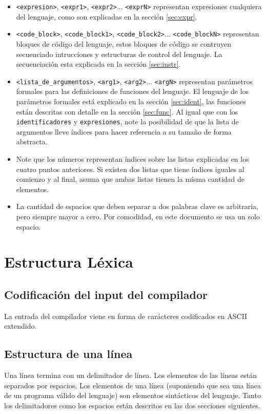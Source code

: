 \documentclass[12pt, spanish]{report}
\begin{document}
\begin{itemize}
\item \texttt{<expresion>}, \texttt{<expr1>}, \texttt{<expr2>}...
  \texttt{<exprN>} representan expresiones cualquiera del lenguaje, como
  son explicadas en la secci\'on \ref{sec:expr}.
       
\item \texttt{<code\_block>}, \texttt{<code\_block1>},
  \texttt{<code\_block2>}...  \texttt{<code\_blockN>} representan
  bloques de c\'odigo del lenguaje, estos bloques de c\'odigo se
  contruyen secuenciado intrucciones y estructuras de control del
  lenguaje. La secuenciaci\'on esta explicada en la secci\'on
  \ref{sec:instr}.
       
\item \texttt{<lista\_de\_argumentos>}, \texttt{<arg1>},
  \texttt{<arg2>}...  \texttt{<argN>} representan par\'ametros formales
  para las definiciones de funciones del lenguaje. El lenguaje de los
  par\'ametros formales est\'a explicado en la secci\'on
  \ref{sec:ident}, las funciones est\'an descritas con detalle en la
  secci\'on \ref{sec:func}. Al igual que con los
  \texttt{identificadores} y \texttt{expresiones}, note la posibilidad
  de que la lista de argumentos lleve \'indices para hacer referencia a
  su tama\~no de forma abstracta.

\item Note que los n\'umeros representan \'indices sobre las listas
  explicadas en los cuatro puntos anteriores. Si existen dos listas que
  tiene \'indices iguales al comienzo y al final, asuma que ambas listas
  tienen la m\'isma cantidad de elementos.
       
\item La cantidad de espacios que deben separar a dos palabras clave
  es arbitraria, pero siempre mayor a cero. Por comodidad, en este
  documento se usa un solo espacio.
\end{itemize}


\chapter{Estructura L\'exica}

\section{Codificaci\'on del input del compilador}
\label{sec:codif}
La entrada del compilador viene en forma de car\'acteres
codificados en ASCII extendido.

\section{Estructura de una l\'inea}
\label{sec:line_struct}
Una l\'inea termina con un delimitador de l\'inea. Los elementos
de las l\'ineas est\'an separados por espacios. Los elementos de una
l\'inea (suponiendo que sea una l\'inea de un programa v\'alido del
lenguaje) son elementos sint\'acticos del lenguaje. Tanto los delimitadores
como los espacios est\'an descritos en las dos secciones siguientes.
\end{document}
